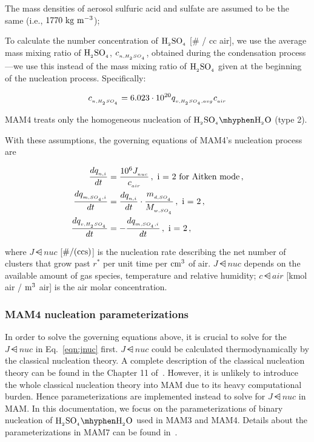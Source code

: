 \begin{assume}
  The mass densities of aerosol sulfuric acid and sulfate are assumed to be the
  same (i.e., $\rm 1770~kg~m^{-3}$);
\end{assume}

\begin{assume}
  To calculate the number concentration of $\rm H_{_2}SO_{_4}$ [\# / cc air], we use the
  average mass mixing ratio of $\rm H_{_2}SO_{_4}$, $c_{_{n,H_{_2}SO_{_4}}}$, obtained during the
  condensation process---we use this instead of the mass mixing ratio of $\rm H_{_2}SO_{_4}$
  given at the beginning of the nucleation process. Specifically:

  $$c_{_{n,H_{_2}SO_{_4}}} = 6.023 \cdot 10^{20} q_{_{v,H_{_2}SO_{_4},avg}} c_{_{air}}$$

\end{assume}

\begin{assume}
  MAM4 treats only the homogeneous nucleation of $\rsag \mhyphen \rwater$
  (type 2).
\end{assume}

With these assumptions, the governing equations of MAM4's nucleation process
are

\begin{align}
\frac{dq_{_{n,i}}}{dt} &= \frac{10^6 J_{_{nuc}}}{c_{_{air}}} \,, \text{ i = 2 for Aitken mode} \,, \label{eqn:jnuc} \\
\frac{dq_{_{m,SO_{_4},i}}}{dt} &= \frac{dq_{_{n,i}}}{dt} \cdot \frac{m_{_{d,SO_{_4}}}}{M_{_{w,SO_{_4}}}} \,, \text{ i = 2} \,, \label{eqn:amass} \\
\frac{dq_{_{v,H_{_2}SO_{_4}}}}{dt} &= -\frac{dq_{_{m,SO_{_4},i}}}{dt} \,, \text{ i = 2} \,, \label{eqn:vmass}
\end{align}

where $J\dsub{nuc}$ [$\rm \# / (cc s)$] is the nucleation rate describing the
net number of clusters that grow past $r^*$ per unit time per $\rm cm^{3}$ of
air. $J\dsub{nuc}$ depends on the available amount of gas species, temperature
and relative humidity; $c\dsub{air}$ [kmol air / $\rm m^3$ air] is the air molar
concentration.

\subsubsection{MAM4 nucleation parameterizations} 

In order to solve the governing equations above, it is crucial to solve for the
$J\dsub{nuc}$ in Eq.~\eqref{eqn:jnuc} first. $J\dsub{nuc}$ could be calculated
thermodynamically by the classical nucleation theory. A complete description of
the classical nucleation theory can be found in the Chapter 11 of~\cite{seinfeld-2006-acp}.
However, it is unlikely to introduce the whole classical nucleation theory into MAM
due to its heavy computational burden. Hence parameterizations are implemented
instead to solve for $J\dsub{nuc}$ in MAM. In this documentation, we focus on
the parameterizations of binary nucleation of $\rsag \mhyphen \rwater$ used in
MAM3 and MAM4. Details about the parameterizations in MAM7 can be found
in~\cite{merikanto-2007-jgr}.

